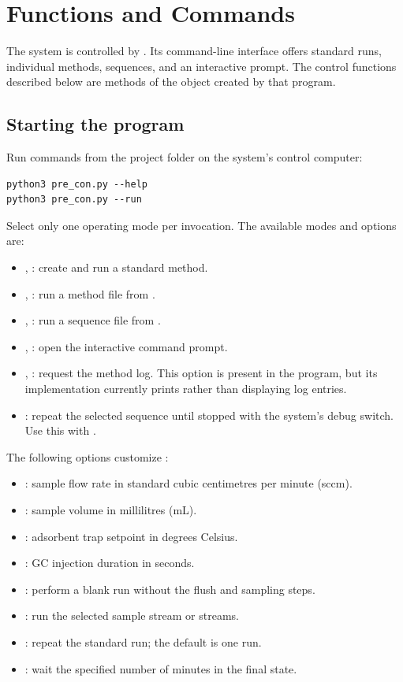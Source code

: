 \section{Functions and Commands}
\label{Functions and Commands}

The system is controlled by . Its command-line interface
offers standard runs, individual methods, sequences, and an interactive
prompt. The control functions described below are methods of the
 object created by that program.

\subsection{Starting the program}

Run commands from the project folder on the system's control computer:
\begin{verbatim}
python3 pre_con.py --help
python3 pre_con.py --run
\end{verbatim}

Select only one operating mode per invocation. The available modes and
options are:
\begin{itemize}
    \item {}, : create and run a standard method.
    \item {}, : run a method file from
    .
    \item {}, : run a sequence file from
    .
    \item {}, : open the interactive command prompt.
    \item {}, : request the method log. This option is
    present in the program, but its implementation currently prints
     rather than displaying log entries.
    \item {}: repeat the selected sequence until stopped
    with the system's debug switch. Use this with .
\end{itemize}

The following options customize :
\begin{itemize}
    \item {}: sample flow rate in standard cubic centimetres per
    minute (sccm).
    \item {}: sample volume in millilitres (mL).
    \item {}: adsorbent trap setpoint in degrees Celsius.
    \item {}: GC injection duration in seconds.
    \item {}: perform a blank run without the flush and sampling
    steps.
    \item {}: run the selected sample stream or streams.
    \item {}: repeat the standard run; the default is one run.
    \item {}: wait the specified number of minutes in the final
     state.
\end{itemize}

